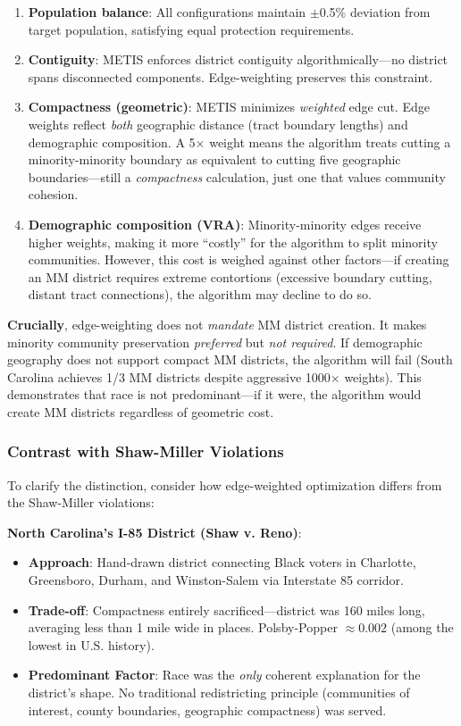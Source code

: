 \begin{enumerate}
    \item \textbf{Population balance}: All configurations maintain $\pm$0.5\% deviation from target population, satisfying equal protection requirements.
    \item \textbf{Contiguity}: METIS enforces district contiguity algorithmically---no district spans disconnected components. Edge-weighting preserves this constraint.
    \item \textbf{Compactness (geometric)}: METIS minimizes \emph{weighted} edge cut. Edge weights reflect \emph{both} geographic distance (tract boundary lengths) and demographic composition. A 5$\times$ weight means the algorithm treats cutting a minority-minority boundary as equivalent to cutting five geographic boundaries---still a \emph{compactness} calculation, just one that values community cohesion.
    \item \textbf{Demographic composition (VRA)}: Minority-minority edges receive higher weights, making it more ``costly'' for the algorithm to split minority communities. However, this cost is weighed against other factors---if creating an MM district requires extreme contortions (excessive boundary cutting, distant tract connections), the algorithm may decline to do so.
\end{enumerate}

\textbf{Crucially}, edge-weighting does not \emph{mandate} MM district creation. It makes minority community preservation \emph{preferred} but \emph{not required}. If demographic geography does not support compact MM districts, the algorithm will fail (South Carolina achieves 1/3 MM districts despite aggressive 1000$\times$ weights). This demonstrates that race is not predominant---if it were, the algorithm would create MM districts regardless of geometric cost.

\subsubsection{Contrast with Shaw-Miller Violations}

To clarify the distinction, consider how edge-weighted optimization differs from the Shaw-Miller violations:

\textbf{North Carolina's I-85 District (Shaw v. Reno)}:
\begin{itemize}
    \item \textbf{Approach}: Hand-drawn district connecting Black voters in Charlotte, Greensboro, Durham, and Winston-Salem via Interstate 85 corridor.
    \item \textbf{Trade-off}: Compactness entirely sacrificed---district was 160 miles long, averaging less than 1 mile wide in places. Polsby-Popper $\approx 0.002$ (among the lowest in U.S. history).
    \item \textbf{Predominant Factor}: Race was the \emph{only} coherent explanation for the district's shape. No traditional redistricting principle (communities of interest, county boundaries, geographic compactness) was served.
\end{itemize}

